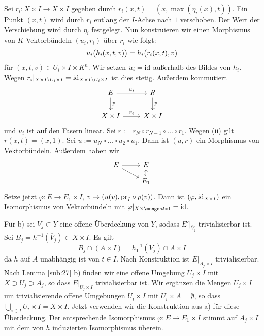\noindent Sei $r_i \colon X \times I \to X \times I$ gegeben durch $r_i(x,t)=(x, \max(\eta_i(x),t))$. Ein Punkt $(x,t)$ wird durch $r_i$ entlang der $I$-Achse nach $1$ verschoben. Der 
Wert der Verschiebung wird durch $\eta_i$ festgelegt.
Nun konstruieren wir einen Morphismus von $K$-Vektorbündeln $(u_i,r_i)$ über $r_i$ wie folgt: 
\[
	u_i \enbrace[\big]{h_i(x,t,v)} = h_i \enbrace[\big]{r_i(x,t),v}  
\]
für $(x,t,v) \in U_i \times I \times K^n$. Wir setzen $u_i=\id$ außerhalb des Bildes von $h_i$. Wegen 
$r_i|_{X \times I\setminus{U_i} \times I} =\id_{X \times I \setminus U_i \times I}$ ist dies stetig. Außerdem kommutiert
\[
	\begin{tikzcd}
		E \rar["u_i"] \dar["p"]& R \dar["p"]\\
		X\times I \rar["r_i"] & X \times I
	\end{tikzcd}
\]
und $u_i$ ist auf den Fasern linear. Sei $r :=r_N \circ r_{N-1} \circ \ldots \circ r_1$. Wegen (ii) gilt $r(x,t)=(x,1)$. Sei $u := u_N \circ \ldots \circ u_2 \circ u_1$.
Dann ist $(u,r)$ ein Morphismus von Vektorbündeln. 
Außerdem haben wir 
\[
	\begin{tikzcd}[row sep=small]
		E \rar \drar & E \\
		& E_1 \uar[hook]
	\end{tikzcd}
\]
Setze jetzt $\varphi \colon E \to E_1 \times I$, $v \mapsto \enbrace*{u(v), \pr_I \circ p(v)} $. Dann ist $(\varphi, \id_{X \times I})$ ein Isomorphismus von Vektorbündeln 
mit $\varphi|_{X \times \set{1}} =\id$. 

Für b) sei $V_j \subset Y$ eine offene Überdeckung von $Y$, sodass $E'|_{\overline{V}_j}$ trivialisierbar ist. Sei $B_j = h ^{-1}(\overline{V}_j) \subset X \times I$. Es 
gilt 
\[
	B_j \cap (A \times I) = h_1 ^{-1}(\overline{V}_j) \cap A \times I
\]
da $h$ auf $A$ unabhängig ist von $t \in I$. Nach Konstruktion ist $E|_{A_j \times I}$ trivialisierbar. Nach Lemma \ref{sub:27} b) finden wir eine offene Umgebung 
$U_j \times I$ mit $X \supset U_j \supset A_j$, so dass $E|_{U_j \times I}$ trivialisierbar ist. Wir ergänzen die Mengen $U_j \times I$ um trivialisierende offene Umgebungen 
$U_i \times I$ mit $U_i \times A = \emptyset$, so dass $\bigcup_{i\in I} U_i \times I = X \times I$. Jetzt verwenden wir die Konstruktion aus a) für diese Überdeckung. Der 
entsprechende Isomorphismus $\varphi \colon E \to E_1 \times I$ stimmt auf $A_j \times I$ mit dem von $h$ induzierten Isomorphismus überein. \bewende 


